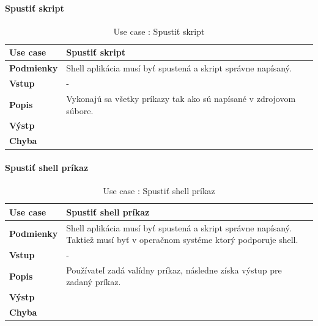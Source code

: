 \paragraph{Spustiť skript}
\begin{center}
	\begin{table}[htbp]
		\begin{tabular}{|p{2.5cm}|p{14cm}|}
			\hline
			\textbf{Use case} & Spustiť skript \\ 
			\hline
			\textbf{Podmienky} & Shell aplikácia musí byť spustená a skript správne napísaný.\\ 
			\hline
			\textbf{Vstup} & -\\
			\hline
			\textbf{Popis} & Vykonajú sa všetky príkazy tak ako sú napísané v zdrojovom súbore. \\ 
			\hline
			\textbf{Výstp} & \\
			\hline
			\textbf{Chyba} & \\
			\hline
		\end{tabular}
	\label{table:1}
	\caption{Use case : Spustiť skript}
	\end{table}
\end{center}
\newpage
\paragraph{Spustiť shell príkaz}
\begin{center}
	\begin{table}[htbp]
		\begin{tabular}{|p{2.5cm}|p{14cm}|}
			\hline
			\textbf{Use case} & Spustiť shell príkaz \\ 
			\hline
			\textbf{Podmienky} & Shell aplikácia musí byť spustená a skript správne napísaný. Taktiež musí byť v operačnom systéme ktorý podporuje shell. \\ 
			\hline
			\textbf{Vstup} & -\\
			\hline
			\textbf{Popis} & Používateľ zadá valídny príkaz, následne získa výstup pre zadaný príkaz. \\ 
			\hline
			\textbf{Výstp} & \\
			\hline
			\textbf{Chyba} & \\
			\hline
		\end{tabular}
	\label{table:1}
	\caption{Use case : Spustiť shell príkaz}
	\end{table}
\end{center}

